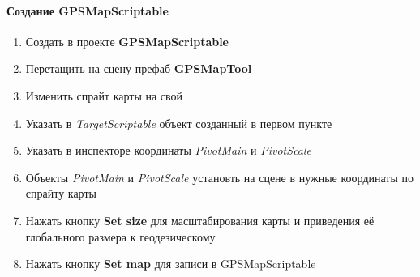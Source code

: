 \documentclass[a4paper, 11pt, titlepage]{article}
\begin{document}
        \paragraph{Создание GPSMapScriptable}
          \begin{enumerate}
            \item Создать в проекте \textbf{GPSMapScriptable}
            \item Перетащить на сцену префаб \textbf{GPSMapTool}
            \item Изменить спрайт карты на свой
            \item Указать в \textit{TargetScriptable} объект созданный в первом пункте
            \item Указать в инспекторе координаты \textit{PivotMain} и \textit{PivotScale}
            \item Объекты \textit{PivotMain} и \textit{PivotScale} установть на сцене в нужные координаты по спрайту карты 
            \item Нажать кнопку \textbf{Set size} для масштабирования карты и приведения её глобального размера к геодезическому
            \item Нажать кнопку \textbf{Set map} для записи в GPSMapScriptable
          \end{enumerate}
\end{document}
